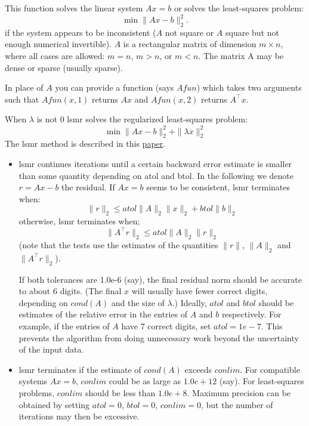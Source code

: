 \begin{mandescription}
This function solves the linear system $Ax = b$ or solves 
the least-squares problem:
$$
      \min \| A x - b \|^2_2. 
$$
if the system appears to be inconsistent ($A$ not square or $A$ square
but not enough numerical invertible). $A$ is a rectangular matrix of 
dimension $m \times n$, where all cases are allowed: $m=n$, $m>n$, or $m<n$. 
The matrix A may be dense or sparse (usually sparse).

In place of $A$ you can provide a function (says $Afun$) which takes two 
arguments such that $Afun(x,1)$ returns $A x$ and   $Afun(x,2)$ 
returns $A^{\top} x$.

When $\lambda$ is not $0$ lsmr solves the regularized least-squares problem:
$$
      \min \| A x - b \|^2_2 + \| \lambda x \|^2_2 
$$
The lsmr method is described in this \href{http://arxiv.org/abs/1006.0758}{paper}.


\begin{itemize}
\item lsmr continues iterations until a certain backward error estimate is smaller 
than some quantity depending on atol and btol. In the following we denote $r = A x - b$ 
the residual. If $A x = b$ seems to be consistent, lsmr terminates when:
$$
   \| r \|_2  \le  atol \| A \|_2 \| x \|_2 + btol \| b \|_2
$$
otherwise, lsmr terminates when;
$$
   \| A^{\top}r \|_2  \le  atol \| A \|_2 \| r \|_2
$$
(note that the tests use the estimates of the quantities $\|r\|$, $\| A \|_2$ and  $\| A^{\top}r \|_2$).

If both tolerances are 1.0e-6 (say), the final residual norm should be
accurate to about 6 digits. (The final $x$ will usually have fewer
correct digits, depending on $cond(A)$ and the size of $\lambda$.)
Ideally, $atol$ and $btol$ should be estimates of the relative error in the
entries of $A$ and $b$ respectively.  For example, if the entries of $A$
have 7 correct digits, set $atol = 1e-7$. This prevents the algorithm
from doing unnecessary work beyond the uncertainty of the input data.

\item lsmr terminates if the estimate of $cond(A)$ exceeds $conlim$.
For compatible systems $Ax = b$, $conlim$ could be as large as $1.0e+12$ (say).  
For least-squares problems, $conlim$ should be less than $1.0e+8$. 
Maximum precision can be obtained by setting $atol = 0$, $btol = 0$, $conlim=0$, 
but the number of iterations may then be excessive.


\end{itemize}
\end{mandescription}
